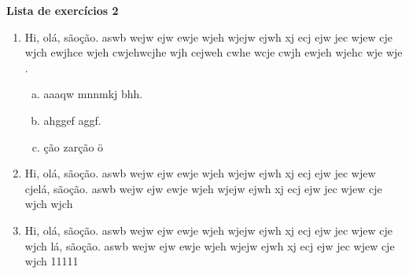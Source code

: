 \documentclass[12pt,onepage,a4paper]{memoir}
\newcommand{\tit}{Lista de exercícios 2}
\begin{document}
\thispagestyle{1pagina}
\vspace*{3.5cm} %
\textbf{\textsf{\large \tit}} %

\begin{enumerate} %
\item Hi, olá, sãoção. aswb wejw ejw ewje wjeh wjejw ejwh xj ecj ejw jec wjew cje wjch ewjhce wjeh cwjehwcjhe wjh cejweh cwhe wcje cwjh ewjeh wjehc wje wje .
	\begin{enumerate}[a.]
	\item aaaqw mnnmkj bhh.
    \item ahggef aggf.
    \item ção zarção ö
	\end{enumerate}
\newpage
\item Hi, olá, sãoção. aswb wejw ejw ewje wjeh wjejw ejwh xj ecj ejw jec wjew cjelá, sãoção. aswb wejw ejw ewje wjeh wjejw ejwh xj ecj ejw jec wjew cje wjch  wjch 

\item Hi, olá, sãoção. aswb wejw ejw ewje wjeh wjejw ejwh xj ecj ejw jec wjew cje wjch lá, sãoção. aswb wejw ejw ewje wjeh wjejw ejwh xj ecj ejw jec wjew cje wjch 11111

\end{enumerate} %
\end{document}
